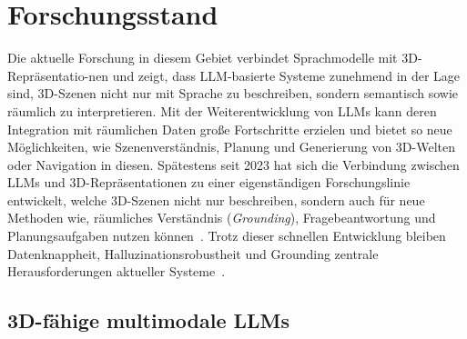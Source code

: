 \chapter{Forschungsstand}\label{ch:stand_der_forschung}

Die aktuelle Forschung in diesem Gebiet verbindet Sprachmodelle mit 3D-Repräsentatio-\newline{}nen und zeigt, dass LLM-basierte Systeme zunehmend in der Lage sind, 3D-Szenen nicht nur mit Sprache zu beschreiben, sondern semantisch sowie räumlich zu interpretieren.
Mit der Weiterentwicklung von LLMs kann deren Integration mit räumlichen Daten große Fortschritte erzielen und bietet so neue Möglichkeiten, wie Szenenverständnis, Planung und Generierung von 3D-Welten oder Navigation in diesen.
Spätestens seit 2023 hat sich die Verbindung zwischen LLMs und 3D-Repräsentationen zu einer eigenständigen Forschungslinie entwickelt, welche 3D-Szenen nicht nur beschreiben, sondern auch für neue Methoden wie, räumliches Verständnis (\textit{Grounding}), Fragebeantwortung und Planungsaufgaben nutzen können~\cite{maWhenLLMsStep2025,hong3DLLMInjecting3D2023}.
Trotz dieser schnellen Entwicklung bleiben Datenknappheit, Halluzinationsrobustheit und Grounding zentrale Herausforderungen aktueller Systeme~\cite{pengUnderstandingEvaluatingHallucinations2025, maWhenLLMsStep2025}.

\section{3D-fähige multimodale LLMs}

